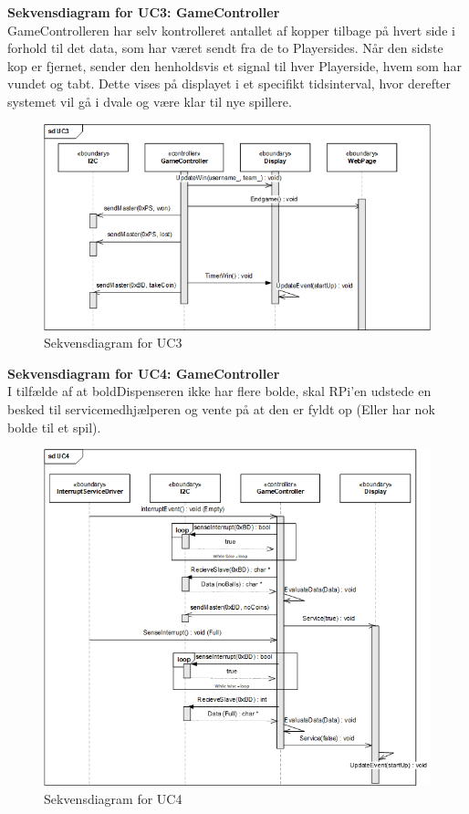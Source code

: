 \documentclass[Arkitektur/System_main.tex]{subfiles}
\begin{document}
\newpage
\textbf{Sekvensdiagram for UC3: GameController}\\
GameControlleren har selv kontrolleret antallet af kopper tilbage på hvert side i forhold til det data, som har været sendt fra de to Playersides. Når den sidste kop er fjernet, sender den henholdsvis et signal til hver Playerside, hvem som har vundet og tabt. Dette vises på displayet i et specifikt tidsinterval, hvor derefter systemet vil gå i dvale og være klar til nye spillere. 

\begin{figure}[H]
    \centering
    \includegraphics[width=\textwidth]{Arkitektur/Softwarearkitektur/Applikationsmodel/RPi/graphics_RPi/UC3_SD.png}
   \caption{Sekvensdiagram for UC3}
    \label{fig:UC3_SD_RPi}
\end{figure}

\newpage
\textbf{Sekvensdiagram for UC4: GameController}\\
I tilfælde af at boldDispenseren ikke har flere bolde, skal RPi'en udstede en besked til servicemedhjælperen og vente på at den er fyldt op (Eller har nok bolde til et spil).

\begin{figure}[H]
    \centering
    \includegraphics[width=\textwidth]{Arkitektur/Softwarearkitektur/Applikationsmodel/RPi/graphics_RPi/UC4_SD.png}
   \caption{Sekvensdiagram for UC4}
    \label{fig:UC4_SD_RPi}
\end{figure}
\end{document}
